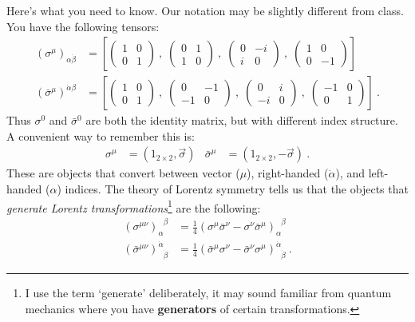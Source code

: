 \documentclass[12pt]{article}
\begin{document}
Here's what you need to know. Our notation may be slightly different from class. You have the following tensors:
\begin{align}
	\left(\sigma^\mu\right)_{\alpha\dot\beta}
	&=
	\left[
	\begin{pmatrix}
		 1 &  0\\
		 0 &  1
	\end{pmatrix}\ , \;
	\begin{pmatrix}
		 0 &  1\\
		 1 &  0
	\end{pmatrix}\ , \;
	\begin{pmatrix}
		 0 & -i\\
		 i &  0
	\end{pmatrix}\ , \;
	\begin{pmatrix}
		 1 &  0\\
		 0 & -1
	\end{pmatrix}
	\right]
	\\
	\left(\bar\sigma^\mu\right)^{\dot\alpha\beta}
	&=
	\left[
	\begin{pmatrix}
		 1 &  0\\
		 0 &  1
	\end{pmatrix}\ , \;
	\begin{pmatrix}
		 0 & -1\\
		-1 &  0
	\end{pmatrix}\ , \;
	\begin{pmatrix}
		 0 &  i\\
		-i &  0
	\end{pmatrix}\ , \;
	\begin{pmatrix}
		-1 &  0\\
		 0 &  1
	\end{pmatrix}
	\right] \ .
\end{align}
Thus $\sigma^0$ and $\bar\sigma^0$ are both the identity matrix, but with different index structure. A convenient way to remember this is:
\begin{align}
	\sigma^\mu &= ({1}_{2\times 2}, \vec{\sigma})
	&
	\bar\sigma^\mu &= ({1}_{2\times 2}, -\vec{\sigma}) \ .
\end{align}
These are objects that convert between vector ($\mu$), right-handed ($\dot\alpha$), and left-handed ($\alpha$) indices. The theory of Lorentz symmetry tells us that the objects that \emph{generate Lorentz transformations}\footnote{I use the term `generate' deliberately, it may sound familiar from quantum mechanics where you have \textbf{generators} of certain transformations.} are the following:
\begin{align}
	\left(\sigma^{\mu\nu}\right)_\alpha^{\phantom\alpha \beta}
	&= 
	\frac 14 \left(\sigma^\mu \bar\sigma^\nu - \sigma^\nu\bar\sigma^\mu\right)_{\alpha}^{\phantom\alpha \beta} 
	\\
	\left(\bar\sigma^{\mu\nu}\right)^{\dot\alpha}_{\phantom\alpha \dot\beta}
	&= 
	\frac 14 \left(\bar\sigma^\mu \sigma^\nu - \bar\sigma^\nu \sigma^\mu\right)^{\dot\alpha}_{\phantom\alpha \dot\beta} \ .
\end{align}
\end{document}
